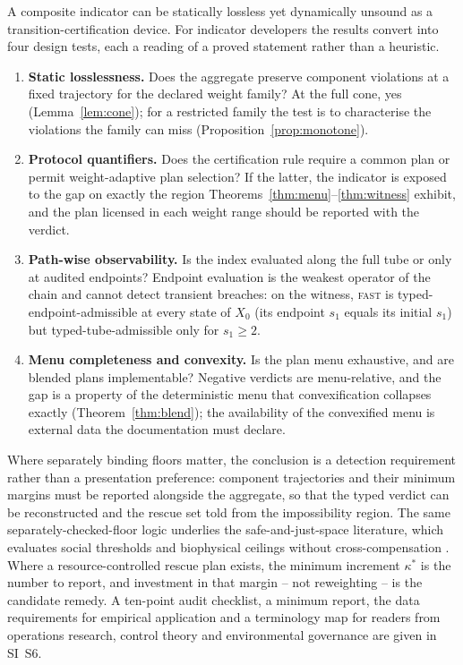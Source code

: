 \documentclass[preprint,11pt,authoryear]{elsarticle}
\theoremstyle{definition}
\theoremstyle{remark}
\newcommand{\act}[1]{\textsc{#1}}
\begin{document}
A composite indicator can be statically lossless yet dynamically unsound as a transition-certification device. For indicator developers the results convert into four design tests, each a reading of a proved statement rather than a heuristic.
\begin{enumerate}[leftmargin=2em]
\item \textbf{Static losslessness.} Does the aggregate preserve component violations at a fixed trajectory for the declared weight family? At the full cone, yes (Lemma~\ref{lem:cone}); for a restricted family the test is to characterise the violations the family can miss (Proposition~\ref{prop:monotone}).
\item \textbf{Protocol quantifiers.} Does the certification rule require a common plan or permit weight-adaptive plan selection? If the latter, the indicator is exposed to the gap on exactly the region Theorems~\ref{thm:menu}--\ref{thm:witness} exhibit, and the plan licensed in each weight range should be reported with the verdict.
\item \textbf{Path-wise observability.} Is the index evaluated along the full tube or only at audited endpoints? Endpoint evaluation is the weakest operator of the chain and cannot detect transient breaches: on the witness, \act{fast} is typed-endpoint-admissible at every state of $X_0$ (its endpoint $s_1$ equals its initial $s_1$) but typed-tube-admissible only for $s_1\ge2$.
\item \textbf{Menu completeness and convexity.} Is the plan menu exhaustive, and are blended plans implementable? Negative verdicts are menu-relative, and the gap is a property of the deterministic menu that convexification collapses exactly (Theorem~\ref{thm:blend}); the availability of the convexified menu is external data the documentation must declare.
\end{enumerate}
Where separately binding floors matter, the conclusion is a detection requirement rather than a presentation preference: component trajectories and their minimum margins must be reported alongside the aggregate, so that the typed verdict can be reconstructed and the rescue set told from the impossibility region. The same separately-checked-floor logic underlies the safe-and-just-space literature, which evaluates social thresholds and biophysical ceilings without cross-compensation \citep{Raworth2012,ONeill2018,Fanning2022}. Where a resource-controlled rescue plan exists, the minimum increment $\kappa^*$ is the number to report, and investment in that margin -- not reweighting -- is the candidate remedy. A ten-point audit checklist, a minimum report, the data requirements for empirical application and a terminology map for readers from operations research, control theory and environmental governance are given in SI~S6.
\end{document}
